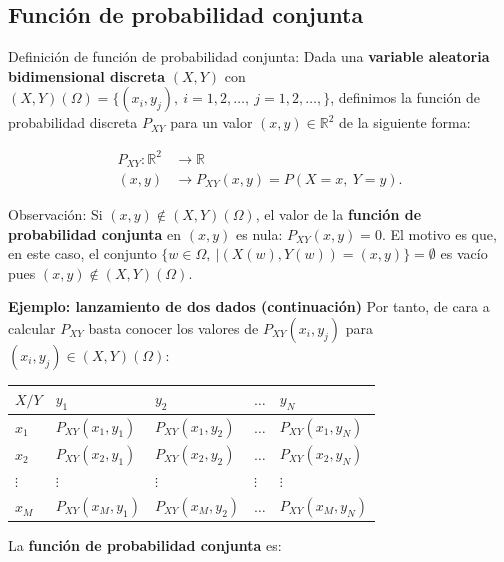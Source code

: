 \documentclass[]{book}
\begin{document}
\hypertarget{funciuxf3n-de-probabilidad-conjunta}{%
\subsection{Función de probabilidad conjunta}\label{funciuxf3n-de-probabilidad-conjunta}}

Definición de función de probabilidad conjunta:
Dada una \textbf{variable aleatoria bidimensional discreta} \((X,Y)\) con \((X,Y)(\Omega)=\{(x_i,y_j),\ i=1,2,\ldots,\ j=1,2,\ldots,\}\), definimos la función de probabilidad discreta \(P_{XY}\) para un valor \((x,y)\in\mathbb{R}^2\) de la siguiente forma:

\[
\begin{array}{rl}
P_{XY}: \mathbb{R}^2 & \longrightarrow \mathbb{R}\\
(x,y) & \longrightarrow P_{XY}(x,y)=P(X= x,\ Y= y).
\end{array}
\]

Observación:
Si \((x,y)\not\in (X,Y)(\Omega)\), el valor de la \textbf{función de probabilidad conjunta} en \((x,y)\) es nula: \(P_{XY}(x,y)=0\). El motivo es que, en este caso, el conjunto \(\{w\in\Omega,\ | (X(w),Y(w))=(x,y)\}=\emptyset\) es vacío pues \((x,y)\not\in (X,Y)(\Omega)\).

\textbf{Ejemplo: lanzamiento de dos dados (continuación)}
Por tanto, de cara a calcular \(P_{XY}\) basta conocer los valores de \(P_{XY}(x_i,y_j)\) para \((x_i,y_j)\in (X,Y)(\Omega)\):

\begin{longtable}[]{@{}lllll@{}}
\toprule
\(X/Y\) & \(y_1\) & \(y_2\) & \(\ldots\) & \(y_N\)\tabularnewline
\midrule
\endhead
\(x_1\) & \(P_{XY}(x_1,y_1)\) & \(P_{XY}(x_1,y_2)\) & \(\ldots\) & \(P_{XY}(x_1,y_N)\)\tabularnewline
\(x_2\) & \(P_{XY}(x_2,y_1)\) & \(P_{XY}(x_2,y_2)\) & \(\ldots\) & \(P_{XY}(x_2,y_N)\)\tabularnewline
\(\vdots\) & \(\vdots\) & \(\vdots\) & \(\vdots\) & \(\vdots\)\tabularnewline
\(x_M\) & \(P_{XY}(x_M,y_1)\) & \(P_{XY}(x_M,y_2)\) & \(\ldots\) & \(P_{XY}(x_M,y_N)\)\tabularnewline
\bottomrule
\end{longtable}

La \textbf{función de probabilidad conjunta} es:
\end{document}
